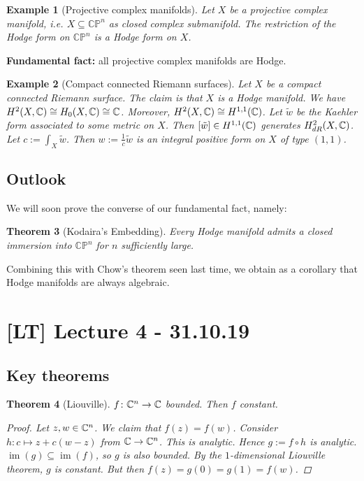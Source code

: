 \documentclass[A4paper, british]{amsart}
\theoremstyle{darkgreentheorem}
\newtheorem{thm}{Theorem}[section]
\theoremstyle{darkbluedefinition}
\theoremstyle{darkredexample}
\newtheorem{exa}[thm]{Example}
\theoremstyle{remark}
\DeclareMathOperator{\im}{im}
\newcommand{\CP}{\mathbb{CP}}
\newcommand{\1}{\mathbbm{1}}
\begin{document}
\begin{exa}[Projective complex manifolds]
    Let $X$ be a projective complex manifold, i.e. $X\subseteq \CP^{n}$ as closed complex submanifold.
    The restriction of the Hodge form on $\CP^{n}$ is a Hodge form on $X$.
\end{exa}

\textbf{Fundamental fact:} all projective complex manifolds are Hodge.

\begin{exa}[Compact connected Riemann surfaces]
    Let $X$ be a compact connected Riemann surface.
    The claim is that $X$ is a Hodge manifold.
    We have $H^{2}(X,\mathbb{C})\cong H_{0}(X,\mathbb{C})\cong \mathbb{C}$.
    Moreover, $H^{2}(X,\mathbb{C})\cong H^{1,1}(\mathbb{C})$.
    Let $\tilde{w}$ be the Kaehler form associated to some metric on $X$.
    Then $[\tilde{w}]\in H^{1,1}(\mathbb{C})$ generates $H_{dR}^{2}(X,\mathbb{C})$.
    Let $c:=\int_{X}\tilde{w}$.
    Then $w:=\frac{1}{c}\tilde{w}$ is an integral positive form on $X$ of type $(1,1)$.
\end{exa}

\subsection{Outlook}

We will soon prove the converse of our fundamental fact, namely:

\begin{thm}[Kodaira's Embedding]
    Every Hodge manifold admits a closed immersion into $\CP^{n}$ for $n$ sufficiently large.
\end{thm}

Combining this with Chow's theorem seen last time, we obtain as a corollary that Hodge manifolds are always algebraic.

\section{[LT] Lecture 4 - 31.10.19}

\subsection{Key theorems}

\begin{thm}[Liouville]
    $f\colon \mathbb{C}^{n}\to \mathbb{C}$ bounded.
    Then $f$ constant.
    \begin{proof}
	Let $z,w\in \mathbb{C}^{n}$.
	We claim that $f(z)=f(w)$.
	Consider $h\colon c\mapsto z+c(w-z)$ from $\mathbb{C}\to \mathbb{C}^{n}$.
	This is analytic.
	Hence $g:=f\circ h$ is analytic.
	$\im(g)\subseteq \im(f)$, so $g$ is also bounded.
	By the $1$-dimensional Liouville theorem, $g$ is constant.
	But then $f(z)=g(0)=g(1)=f(w)$.
    \end{proof}
\end{thm}
\end{document}
